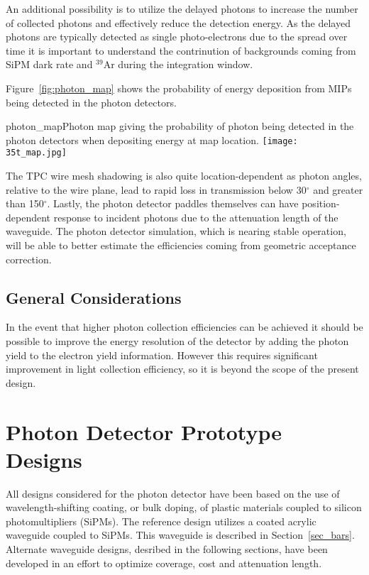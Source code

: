 An additional possibility is to utilize the delayed photons to
increase the number of collected photons and effectively reduce the
detection energy. As the delayed photons are typically detected as
single photo-electrons due to the spread over time it is important to
understand the contrinution of backgrounds coming from SiPM dark rate
and $^{39}$Ar during the integration window.   

Figure~\ref{fig:photon_map}
shows the probability of energy deposition from MIPs being
detected in the photon detectors.

\begin{cdrfigure}{photon_map}{Photon map giving the probability of photon being 
  detected in the photon detectors when depositing energy at map location.}
  \texttt{[image: 35t\_map.jpg]}
\end{cdrfigure}

The TPC wire mesh shadowing is also quite location-dependent as photon
angles, relative to the wire plane, lead to rapid loss in transmission
below 30$^{\circ}$ and greater than 150$^{\circ}$. Lastly, the photon
detector paddles themselves can have position-dependent response to
incident photons due to the attenuation length of the waveguide. The
photon detector simulation, which is nearing stable operation, will be
able to better estimate the efficiencies coming from geometric
acceptance correction.

\subsection{General Considerations}

In the event that higher photon collection efficiencies can be
achieved it should be possible to improve the energy resolution of the
detector by adding the photon yield to the electron yield information.
However this requires significant improvement in light collection
efficiency, so it is beyond the scope of the present design. 

\section{Photon Detector Prototype Designs}

All designs considered for the photon detector have been based on the
use of wavelength-shifting coating, or bulk doping, of plastic
materials coupled to silicon photomultipliers (SiPMs). The reference
design utilizes a coated acrylic waveguide coupled to
SiPMs. This waveguide is described in
Section~\ref{sec_bars}. Alternate waveguide designs, desribed in the
following sections, have been developed in an effort to optimize
coverage, cost and attenuation length.  

